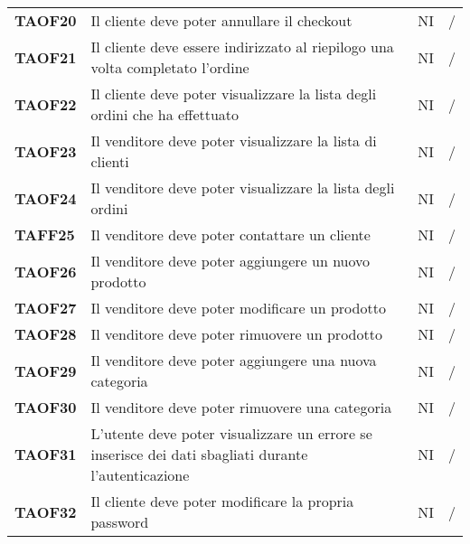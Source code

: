 \begin{center}
\begin{longtable}[!h]{p{60px} p{240px} p{35px} p{35px}}
        \textbf{TAOF20} & Il cliente deve poter annullare il checkout                                                         & NI             & /              \\
        \textbf{TAOF21} & Il cliente deve essere indirizzato al riepilogo una volta completato l'ordine                       & NI             & /              \\
        \textbf{TAOF22} & Il cliente deve poter visualizzare la lista degli ordini che ha effettuato                          & NI             & /              \\
        \textbf{TAOF23} & Il venditore deve poter visualizzare la lista di clienti                                            & NI             & /              \\
        \textbf{TAOF24} & Il venditore deve poter visualizzare la lista degli ordini                                          & NI             & /              \\
        \textbf{TAFF25} & Il venditore deve poter contattare un cliente                                                       & NI             & /              \\
        \textbf{TAOF26} & Il venditore deve poter aggiungere un nuovo prodotto                                                & NI             & /              \\
        \textbf{TAOF27} & Il venditore deve poter modificare un prodotto                                                      & NI             & /              \\
        \textbf{TAOF28} & Il venditore deve poter rimuovere un prodotto                                                       & NI             & /              \\
        \textbf{TAOF29} & Il venditore deve poter aggiungere una nuova categoria                                              & NI             & /              \\
        \textbf{TAOF30} & Il venditore deve poter rimuovere una categoria                                                     & NI             & /              \\
        \textbf{TAOF31} & L'utente deve poter visualizzare un errore se inserisce dei dati sbagliati durante l'autenticazione & NI             & /              \\
        \textbf{TAOF32} & Il cliente deve poter modificare la propria password                                                & NI             & /              \\
    \end{longtable}
\end{center}
